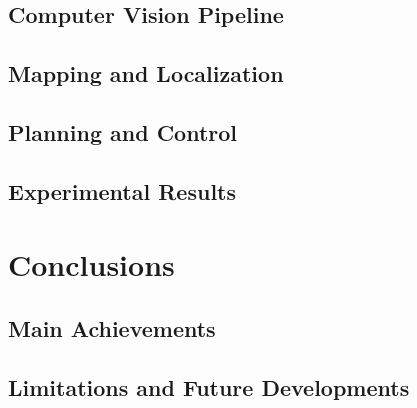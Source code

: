 \documentclass[a4paper,11pt,oneside]{book}
\begin{document}
\section{Computer Vision Pipeline}

\section{Mapping and Localization}

\section{Planning and Control}

\section{Experimental Results}


\chapter{Conclusions}

\section{Main Achievements}

\section{Limitations and Future Developments}
\end{document}
